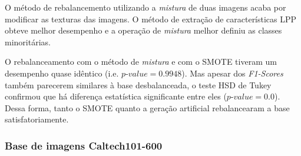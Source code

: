 
O método de rebalancemento utilizando a \emph{mistura} de duas imagens acaba por modificar as texturas das imagens. O método de extração de características LPP obteve melhor desempenho e a operação de \emph{mistura} melhor definiu as classes minoritárias.

O rebalanceamento com o método de \emph{mistura} e com o SMOTE tiveram um desempenho quase idêntico (i.e. $\textit{p-value} = 0.9948$). Mas apesar dos \textit{F1-Scores} também parecerem similares à base desbalanceada, o teste HSD de Tukey confirmou que há diferença estatística significante entre eles ($\textit{p-value} = 0.0$). Dessa forma, tanto o SMOTE quanto a geração artificial rebalancearam a base satisfatoriamente.

\subsubsection{Base de imagens Caltech101-600}



